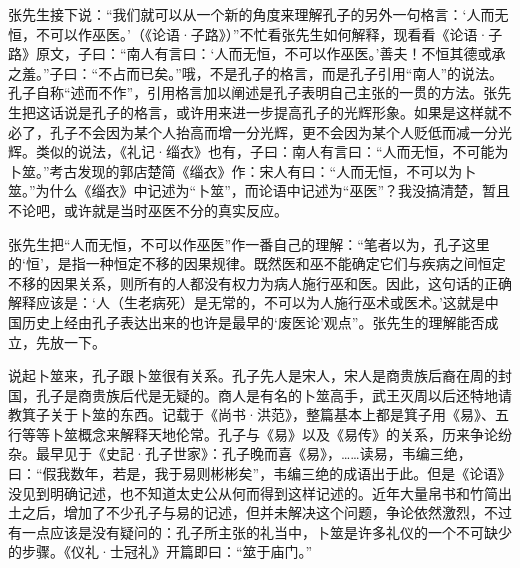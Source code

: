 张先生接下说：“我们就可以从一个新的角度来理解孔子的另外一句格言：‘人而无恒，不可以作巫医。’（《论语·子路》）”不忙看张先生如何解释，现看看《论语·子路》原文，子曰：“南人有言曰：‘人而无恒，不可以作巫医。’善夫！不恒其德或承之羞。”子曰：“不占而已矣。”哦，不是孔子的格言，而是孔子引用“南人”的说法。孔子自称“述而不作”，引用格言加以阐述是孔子表明自己主张的一贯的方法。张先生把这话说是孔子的格言，或许用来进一步提高孔子的光辉形象。如果是这样就不必了，孔子不会因为某个人抬高而增一分光辉，更不会因为某个人贬低而减一分光辉。类似的说法，《礼记·缁衣》也有，子曰：南人有言曰：“人而无恒，不可能为卜筮。”考古发现的郭店楚简《缁衣》作：宋人有曰：“人而无恒，不可以为卜筮。”为什么《缁衣》中记述为“卜筮”，而论语中记述为“巫医”？我没搞清楚，暂且不论吧，或许就是当时巫医不分的真实反应。

张先生把“人而无恒，不可以作巫医”作一番自己的理解：“笔者以为，孔子这里的‘恒’，是指一种恒定不移的因果规律。既然医和巫不能确定它们与疾病之间恒定不移的因果关系，则所有的人都没有权力为病人施行巫和医。因此，这句话的正确解释应该是：‘人（生老病死）是无常的，不可以为人施行巫术或医术。’这就是中国历史上经由孔子表达出来的也许是最早的‘废医论’观点”。张先生的理解能否成立，先放一下。

说起卜筮来，孔子跟卜筮很有关系。孔子先人是宋人，宋人是商贵族后裔在周的封国，孔子是商贵族后代是无疑的。商人是有名的卜筮高手，武王灭周以后还特地请教箕子关于卜筮的东西。记载于《尚书·洪范》，整篇基本上都是箕子用《易》、五行等等卜筮概念来解释天地伦常。孔子与《易》以及《易传》的关系，历来争论纷杂。最早见于《史記·孔子世家》：孔子晚而喜《易》，……读易，韦编三绝，曰：“假我数年，若是，我于易则彬彬矣”，韦编三绝的成语出于此。但是《论语》没见到明确记述，也不知道太史公从何而得到这样记述的。近年大量帛书和竹简出土之后，增加了不少孔子与易的记述，但并未解决这个问题，争论依然激烈，不过有一点应该是没有疑问的：孔子所主张的礼当中，卜筮是许多礼仪的一个不可缺少的步骤。《仪礼·士冠礼》开篇即曰：“筮于庙门。”

